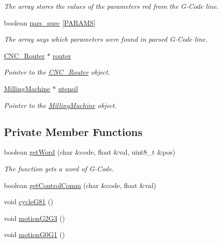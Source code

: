 \begin{DoxyCompactItemize}
\begin{DoxyCompactList}\small\item\em The array stores the values of the parameters red from the G-\/\+Code line. \end{DoxyCompactList}\item 
boolean \hyperlink{class_g_code_a6d11b02685ef1b387a3c9da004547006}{pars\+\_\+spec} \mbox{[}\hyperlink{_g_code__def_8h_ab0b1e59d96396ba9dca2147f9feb44eb}{P\+A\+R\+A\+M\+S}\mbox{]}
\begin{DoxyCompactList}\small\item\em The array says which parameters were found in parsed G-\/\+Code line. \end{DoxyCompactList}\item 
\hyperlink{class_c_n_c___router}{C\+N\+C\+\_\+\+Router} $\ast$ \hyperlink{class_g_code_ab060bb5bd169ae7640eb781bef6b78fe}{router}
\begin{DoxyCompactList}\small\item\em Pointer to the \hyperlink{class_c_n_c___router}{C\+N\+C\+\_\+\+Router} object. \end{DoxyCompactList}\item 
\hyperlink{class_milling_machine}{Milling\+Machine} $\ast$ \hyperlink{class_g_code_a9a737c33f133cf515926d0f2b612bd22}{utensil}
\begin{DoxyCompactList}\small\item\em Pointer to the \hyperlink{class_milling_machine}{Milling\+Machine} object. \end{DoxyCompactList}\end{DoxyCompactItemize}
\subsection*{Private Member Functions}
\begin{DoxyCompactItemize}
\item 
boolean \hyperlink{class_g_code_a3917539a094b14d9928bb00ed74eabfe}{get\+Word} (char \&code, float \&val, uint8\+\_\+t \&pos)
\begin{DoxyCompactList}\small\item\em The function gets a word of G-\/\+Code. \end{DoxyCompactList}\item 
boolean \hyperlink{class_g_code_a7b19fe1d76f1c08139011399ca889c1e}{get\+Control\+Comm} (char \&code, float \&val)
\item 
void \hyperlink{class_g_code_ad754ef6693a2b3422c6adaafbc8a2f79}{cycle\+G81} ()
\item 
void \hyperlink{class_g_code_a44eabd18f470e248fed7a53df495d05f}{motion\+G2\+G3} ()
\item 
void \hyperlink{class_g_code_a74e9e50305d574e214eb8b5a7c55a9f6}{motion\+G0\+G1} ()
\end{DoxyCompactItemize}



